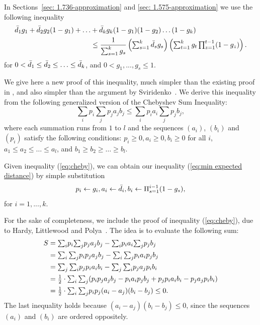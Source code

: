 \documentclass[oneside,final]{ucr}
\begin{document}
In Sections~\ref{sec: 1.736-approximation} and \ref{sec: 1.575-approximation}
we use the following inequality
%
\begin{align}
  \label{eq:min expected distance}
  {\bar d}_1 g_1 + {\bar d}_2 g_2 (1-g_1) +
  \ldots &+ {\bar d}_k g_k (1-g_1) (1-g_2) \ldots (1-g_k)\\ \notag
  &\leq \frac{1}{\sum_{s=1}^k g_s} \left(\textstyle\sum_{s=1}^k {\bar d}_s g_s\right)\left(\textstyle\sum_{t=1}^k g_t \textstyle\prod_{z=1}^{t-1} (1-g_z)\right).
\end{align}
%
for $0 < {\bar d}_1\leq {\bar d}_2 \leq \ldots \leq {\bar d}_k$, and
$0 < g_1,...,g_s \le 1$.

\medskip

We give here a new proof of this inequality, much simpler
than the existing proof in \cite{ChudakS04}, and also simpler than the
argument by Sviridenko~\cite{Svi02}.  We derive this inequality from
the following generalized version of the Chebyshev Sum Inequality:
%
\begin{equation}
  \label{eq:cheby}
  \textstyle{\sum_{i}} p_i \textstyle{\sum_j} p_j a_j b_j \leq \textstyle{\sum_i} p_i a_i \textstyle{\sum_j} p_j b_j,
\end{equation}
%
where each summation runs from $1$ to $l$ and the sequences $(a_i)$,
$(b_i)$ and $(p_i)$ satisfy the following conditions: $p_i\geq 0, a_i
\geq 0, b_i \geq 0$ for all $i$, $a_1\leq a_2 \leq \ldots \leq a_l$,
and $b_1 \geq b_2 \geq \ldots \geq b_l$.

Given inequality (\ref{eq:cheby}), we can obtain our inequality
(\ref{eq:min expected distance}) by simple substitution
%
\begin{equation*}
  p_i \leftarrow g_i, a_i \leftarrow {\bar d}_i, b_i \leftarrow
  \Pi_{s=1}^{i-1} (1-g_s),
\end{equation*}
%
for $i = 1,...,k$.

For the sake of completeness, we include the proof of inequality (\ref{eq:cheby}), 
due to Hardy, Littlewood and Polya~\cite{HardyLP88}. The idea is to evaluate the 
following sum:
%
\begin{align*}
  S &= \textstyle{\sum_i} p_i \textstyle{\sum_j} p_j a_j b_j - \textstyle{\sum_i} p_i a_i \textstyle{\sum_j} p_j b_j
	\\
  & = \textstyle{\sum_i \sum_j} p_i p_j a_j b_j - \textstyle{\sum_i \sum_j} p_i a_i p_j b_j
	\\
  & = \textstyle{\sum_j \sum_i} p_j p_i a_i b_i - \textstyle{\sum_j \sum _i} p_j a_j p_i b_i
	\\
	&= {\mbox{$\frac{1}{2}$}} \cdot \textstyle{\sum_i \sum_j} (p_i p_j a_j b_j - p_i a_i p_j b_j + p_j p_i a_i
  							b_i - p_j a_j p_i b_i)
\\
  &= {\mbox{$\frac{1}{2}$}} \cdot \textstyle{\sum_i \sum_j} p_i p_j (a_i - a_j)(b_i - b_j) \leq 0.
\end{align*}
The last inequality holds because $(a_i-a_j)(b_i-b_j) \leq 0$, since the sequences
$(a_i)$ and $(b_i)$ are ordered oppositely.
\end{document}
